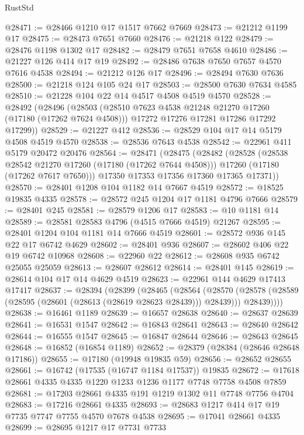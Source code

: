\begin{lexlean}{RustStd}
\begin{coremodule}
@28471 := @28466 @1210 @17 @1517 @7662 @7669
@28473 := @21212 @1199 @17
@28475 := @28473 @7651 @7660
@28476 := @21218 @122
@28479 := @28476 @1198 @1302 @17
@28482 := @28479 @7651 @7658 @4610
@28486 := @21227 @126 @414 @17 @19
@28492 := @28486 @7638 @7650 @7657 @4570 @7616 @4538
@28494 := @21212 @126 @17
@28496 := @28494 @7630 @7636
@28500 := @21218 @124 @105 @24 @17
@28503 := @28500 @7630 @7634 @4585
@28510 := @21228 @104 @22 @14 @4517 @4508 @4519 @4570
@28528 := @28492
    (@28496
      (@28503
        (@28510 @7623 @4538 @21248 @21270 @17260 (@17180 (@17262 @7624 @4508)))
        @17272
        @17276
        @17281
        @17286
        @17292
        @17299))
@28529 := @21227 @412
@28536 := @28529 @104 @17 @14 @5179 @4508 @4519 @4570
@28538 := @28536 @7643 @4538
@28542 := @22961 @411 @5179 @20472 @20476
@28564 := @28471
    (@28475
      (@28482
        (@28528
          (@28538 @28542 @21270 @17260 (@17180 (@17262 @7644 @4508)))
          @17260
          (@17180 (@17262 @7617 @7650)))
        @17350
        @17353
        @17356
        @17360
        @17365
        @17371))
@28570 := @28401 @1208 @104 @1182 @14 @7667 @4519
@28572 := @18525 @19835 @4335
@28578 := @28572 @245 @1204 @17 @1181 @4796 @7666
@28579 := @28401 @245
@28581 := @28579 @1206 @17
@28583 := @10 @1181 @14
@28589 := @28581 @28583 @4796 (@4515 @7666 @4519) @21267
@28595 := @28401 @1204 @104 @1181 @14 @7666 @4519
@28601 := @28572 @936 @145 @22 @17 @6742 @4629
@28602 := @28401 @936
@28607 := @28602 @406 @22 @19 @6742 @10968
@28608 := @22960 @22
@28612 := @28608 @935 @6742 @25055 @25059
@28613 := @28607 @28612
@28614 := @28401 @145
@28619 := @28614 @104 @17 @14 @4629 @4519
@28623 := @22961 @144 @4629 @17413 @17417
@28637 := @28394
    (@28399
      (@28465
        (@28564
          (@28570
            (@28578 (@28589 (@28595 (@28601 (@28613 (@28619 @28623 @28439))) @28439)))
            @28439))))
@28638 := @16461 @1189
@28639 := @16657 @28638
@28640 := @28637 @28639
@28641 := @16531 @1547
@28642 := @16843 @28641
@28643 := @28640 @28642
@28644 := @16555 @1547
@28645 := @16847 @28644
@28646 := @28643 @28645
@28648 := @16852 (@16854 @1189)
@28652 := @28379 (@28384 (@28646 @28648 @17186))
@28655 := @17180 (@19948 @19835 @59)
@28656 := @28652 @28655
@28661 := @16742 (@17535 (@16747 @1184 @17537)) @19835
@28672 := @17618 @28661 @4335 @4335 @1220 @1233 @1236 @1177 @7748 @7758 @4508 @7859
@28681 := @17203 @28661 @4335 @191 @1219 @1302 @11 @7748 @7756 @4704
@28683 := @17216 @28661 @4335
@28693 := @28683 @1217 @414 @17 @19 @7735 @7747 @7755 @4570 @7678 @4538
@28695 := @17041 @28661 @4335
@28699 := @28695 @1217 @17 @7731 @7733

\end{coremodule}
\end{lexlean}
